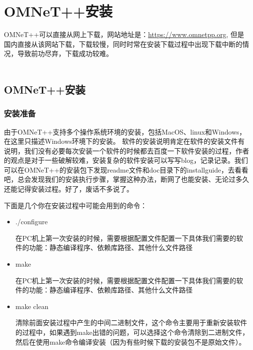 

\chapter{OMNeT++安装}

\begin{summary}
 OMNeT++可以直接从网上下载，网站地址是：\url{https://www.omnetpp.org},
 但是国内直接从该网站下载，下载较慢，同时时常在安装下载过程中出现下载中断的情况，导致前功尽弃，下载成功较难。\\ \\
\end{summary}

\section{OMNeT++安装}

\subsection{安装准备}
由于OMNeT++支持多个操作系统环境的安装，包括MacOS、linux和Windows，在这里只描述Windows环境下的安装。
软件的安装说明肯定在软件的安装文件有说明，我们没有必要每次安装一个软件的时候都去百度一下软件安装的过程，作者的观点是对于一些破解较难，安装复杂的软件安装可以写写blog，记录记录。我们可以在OMNeT++的安装包下发现readme文件和doc目录下的installguide，去看看吧，总会发现我们的安装执行步骤，掌握这种办法，断网了也能安装、无论过多久还能记得安装过程。好了，废话不多说了。

下面是几个你在安装过程中可能会用到的命令：
\begin{itemize}
\item ./configure

在PC机上第一次安装的时候，需要根据配置文件配置一下具体我们需要的软件的功能：静态编译程序、依赖库路径、其他什么文件路径
\item make

在PC机上第一次安装的时候，需要根据配置文件配置一下具体我们需要的软件的功能：静态编译程序、依赖库路径、其他什么文件路径
\item make clean

清除前面安装过程中产生的中间二进制文件，这个命令主要用于重新安装软件的过程中，如果遇到make出错的问题，可以选择这个命令清除到二进制文件，然后在使用make命令编译安装（因为有些时候下载的安装包不是原始文件）。\\ \\
\end{itemize}


